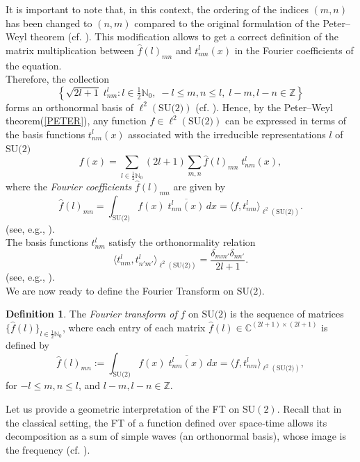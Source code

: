 \documentclass[11pt]{article}
\renewcommand\eqref[1]{(\ref{#1})} %
\theoremstyle{definition}
\newtheorem{defn}[thm]{Definition}
\theoremstyle{remark}
\numberwithin{equation}{section}
\begin{document}
It is important to note that, in this context, the ordering of the indices $(m, n)$ has been changed to $(n, m)$ compared to the original formulation of the Peter–Weyl theorem (cf. \cite{ruzhansky2009pseudo}). This modification allows to get a correct definition of  the matrix multiplication between $\hat{f}(l)_{mn}$ and $t^l_{nm}(x)$ in the Fourier coefficients of the equation.\\%

Therefore, the collection
\[
\left\{\sqrt{2l + 1} \; t^l_{nm} : l \in \tfrac{1}{2} \mathbb{N}_0, \; -l \leq m, n \leq l, \; l - m, l - n \in \mathbb{Z} \right\}
\]
forms an orthonormal basis of $\ell^2(\text{SU(2)})$ (cf. \cite{Preli,ruzhansky2009pseudo}). Hence, by the Peter–Weyl theorem\eqref{PETER}, any function $f \in \ell^2(\text{SU(2)})$ can be expressed in terms of the basis functions $t^l_{nm}(x)$ associated with the irreducible representations $l$ of $\text{SU(2)}$
\[
f(x) = \sum_{l \in \frac{1}{2}\mathbb{N}_0} (2l + 1) \sum_{m, n} \hat{f}(l)_{mn} \; t^l_{nm}(x),
\]
where the \textit{Fourier coefficients} $\hat{f}(l)_{mn}$ are given by
\[
\hat{f}(l)_{mn} = \int_{\text{SU(2)}} f(x) \; \overline{t^l_{nm}(x)} \, dx = \langle f, t^l_{nm} \rangle_{\ell^2(\text{SU(2)})}.
\]
(see, e.g., \cite{ruzhansky2009pseudo}).\\%

The basis functions $t^l_{nm}$ satisfy the orthonormality relation
\[
\langle t^l_{nm}, t^{l}_{n'm'} \rangle_{\ell^2(\text{SU(2)})} = \frac{\delta_{mm'} \delta_{nn'}}{2l + 1}.
\]%
(see, e.g., \cite{ruzhansky2009pseudo,Preli}).\\

We are now ready to define  the Fourier Transform on   $\text{SU(2)}$.                   
\begin{defn}
    The \textit{Fourier transform of }$f$ on $\text{SU(2)}$ is the sequence of matrices $\{ \hat{f}(l) \}_{l \in \frac{1}{2} \mathbb{N}_0}$, where each entry of each matrix $\hat{f}(l) \in \mathbb{C}^{(2l+1) \times (2l+1)}$ is defined by
\[
\hat{f}(l)_{mn} := \int_{\text{SU(2)}} f(x) \; \overline{t^l_{nm}(x)} \, dx = \langle f, t^l_{nm} \rangle_{\ell^2(\text{SU(2)})},
\]
for $-l \leq m, n \leq l$, and $l - m, l - n \in \mathbb{Z}$. %
\end{defn}

Let us provide a geometric interpretation of the FT on $\text{SU}(2)$. Recall that in the classical setting, the FT of a function defined over space-time allows its decomposition as a sum of simple waves (an orthonormal basis), whose image is the frequency  (cf. \cite{stein2011fourier}).\\
\end{document}
